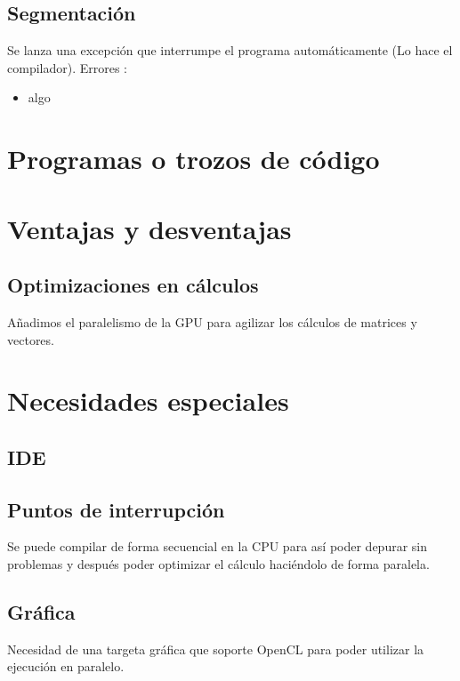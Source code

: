 \documentclass[12pt,a4paper]{article}
\begin{document}
\subsection{Segmentación}
Se lanza una excepción que interrumpe el programa automáticamente (Lo hace el compilador).
Errores :
\begin{itemize}
\item algo
\end{itemize}
\section{Programas o trozos de código}
\section{Ventajas y desventajas}
\subsection{Optimizaciones en cálculos}
Añadimos el paralelismo de la GPU para agilizar los cálculos de matrices y vectores. 
\section{Necesidades especiales}
\subsection{IDE}
\subsection{Puntos de interrupción}
Se puede compilar de forma secuencial en la CPU para así poder depurar sin problemas y después poder optimizar el cálculo haciéndolo de forma paralela.
\subsection{Gráfica}
Necesidad de una targeta gráfica que soporte OpenCL para poder utilizar la ejecución en paralelo.
\end{document}
